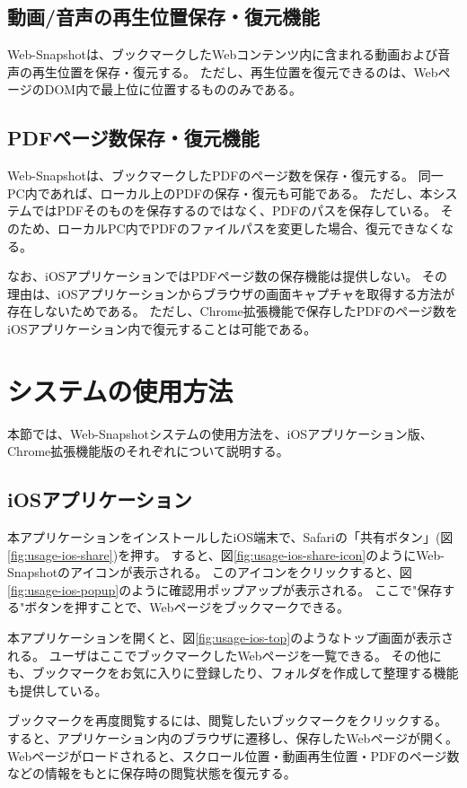\subsection{動画/音声の再生位置保存・復元機能}
Web-Snapshotは、ブックマークしたWebコンテンツ内に含まれる動画および音声の再生位置を保存・復元する。
ただし、再生位置を復元できるのは、WebページのDOM内で最上位に位置するもののみである。

\subsection{PDFページ数保存・復元機能}
Web-Snapshotは、ブックマークしたPDFのページ数を保存・復元する。
同一PC内であれば、ローカル上のPDFの保存・復元も可能である。
ただし、本システムではPDFそのものを保存するのではなく、PDFのパスを保存している。
そのため、ローカルPC内でPDFのファイルパスを変更した場合、復元できなくなる。

なお、iOSアプリケーションではPDFページ数の保存機能は提供しない。
その理由は、iOSアプリケーションからブラウザの画面キャプチャを取得する方法が存在しないためである。
ただし、Chrome拡張機能で保存したPDFのページ数をiOSアプリケーション内で復元することは可能である。

\section{システムの使用方法}
本節では、Web-Snapshotシステムの使用方法を、iOSアプリケーション版、Chrome拡張機能版のそれぞれについて説明する。

\subsection{iOSアプリケーション}
本アプリケーションをインストールしたiOS端末で、Safariの「共有ボタン」(図\ref{fig:usage-ios-share})を押す。
すると、図\ref{fig:usage-ios-share-icon}のようにWeb-Snapshotのアイコンが表示される。
このアイコンをクリックすると、図\ref{fig:usage-ios-popup}のように確認用ポップアップが表示される。
ここで"保存する"ボタンを押すことで、Webページをブックマークできる。

本アプリケーションを開くと、図\ref{fig:usage-ios-top}のようなトップ画面が表示される。
ユーザはここでブックマークしたWebページを一覧できる。
その他にも、ブックマークをお気に入りに登録したり、フォルダを作成して整理する機能も提供している。

ブックマークを再度閲覧するには、閲覧したいブックマークをクリックする。
すると、アプリケーション内のブラウザに遷移し、保存したWebページが開く。
Webページがロードされると、スクロール位置・動画再生位置・PDFのページ数などの情報をもとに保存時の閲覧状態を復元する。

